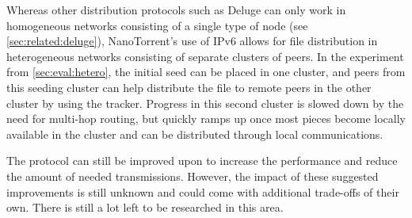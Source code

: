 Whereas other distribution protocols such as Deluge can only work in homogeneous networks consisting of a single type of node (see \ref{sec:related:deluge}), NanoTorrent's use of \gls{IPv6} allows for file distribution in heterogeneous networks consisting of separate clusters of peers. In the experiment from \ref{sec:eval:hetero}, the initial seed can be placed in one cluster, and peers from this seeding cluster can help distribute the file to remote peers in the other cluster by using the tracker. Progress in this second cluster is slowed down by the need for multi-hop routing, but quickly ramps up once most pieces become locally available in the cluster and can be distributed through local communications.

The protocol can still be improved upon to increase the performance and reduce the amount of needed transmissions. However, the impact of these suggested improvements is still unknown and could come with additional trade-offs of their own. There is still a lot left to be researched in this area.
